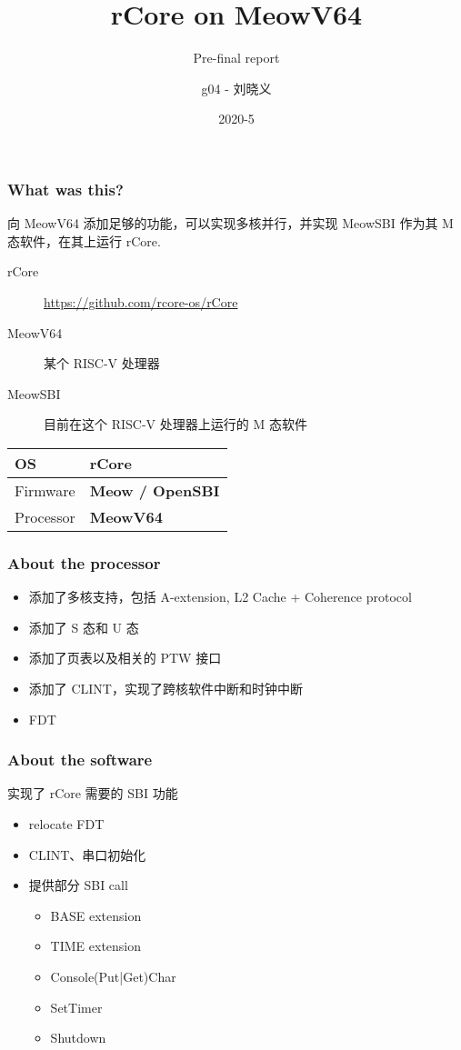 \documentclass[UTF-8]{ctexbeamer}
\title{rCore on MeowV64}
\subtitle{Pre-final report}
\author{g04 - 刘晓义}
\date{2020-5}
\begin{document}
\begin{frame}
  \titlepage
\end{frame}

\begin{frame}
  \frametitle{What was this?}

  向 MeowV64 添加足够的功能，可以实现多核并行，并实现 MeowSBI 作为其 M 态软件，在其上运行 rCore.

  \begin{description}
    \item[rCore] \url{https://github.com/rcore-os/rCore}
    \item[MeowV64] 某个 RISC-V 处理器
    \item[MeowSBI] 目前在这个 RISC-V 处理器上运行的 M 态软件
  \end{description}

  \pause

  \begin{center}
    \begin{tabular}{|ll|} \hline
      OS & \textbf{rCore}\\
      \hline
      Firmware & \textbf{Meow / OpenSBI} \\
      \hline
      Processor & \textbf{MeowV64}\\
      \hline
    \end{tabular}
  \end{center}
\end{frame}
\begin{frame}
  \frametitle{About the processor}

  \begin{itemize}
    \item 添加了多核支持，包括 A-extension, L2 Cache + Coherence protocol
    \item 添加了 S 态和 U 态
    \item 添加了页表以及相关的 PTW 接口
    \item 添加了 CLINT，实现了跨核软件中断和时钟中断
    \item FDT
  \end{itemize}
\end{frame}

\begin{frame}
  \frametitle{About the software}

  实现了 rCore 需要的 SBI 功能

  \begin{itemize}
    \item relocate FDT
    \item CLINT、串口初始化
    \item 提供部分 SBI call
    \begin{itemize}
      \item BASE extension
      \item TIME extension
      \item Console(Put|Get)Char
      \item SetTimer
      \item Shutdown
    \end{itemize}
  \end{itemize}
\end{frame}
\end{document}
